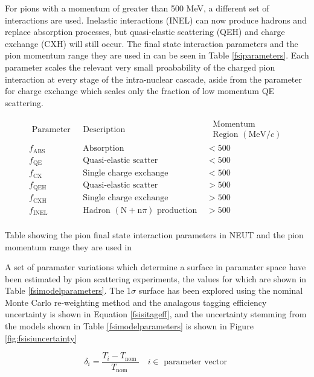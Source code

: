 For pions with a momentum of greater than 500 MeV, a different set of interactions are used. Inelastic interactions (INEL) can now produce hadrons and replace absorption processes, but quasi-elastic scattering (QEH) and charge exchange (CXH) will still occur. The final state interaction parameters and the pion momentum range they are used in can be seen in Table \ref{fsiparameters}. Each parameter scales the relevant very small proabability of the charged pion interaction at every stage of the intra-nuclear cascade, aside from the parameter for charge exchange which scales only the fraction of low momentum QE scattering. 


\begin{table}
$$
\begin{array}{ccc}
\text { Parameter } & \text { Description } & \begin{array}{c}
\text { Momentum } \\
\text { Region }(\mathrm{MeV} / c)
\end{array} \\
f_{\mathrm{ABS}} & \text { Absorption } & <500 \\
f_{\mathrm{QE}} & \text { Quasi-elastic scatter } & <500 \\
f_{\mathrm{CX}} & \text { Single charge exchange } & <500 \\
f_{\mathrm{QEH}} & \text { Quasi-elastic scatter } & >500 \\
f_{\mathrm{CXH}} & \text { Single charge exchange } & >500 \\
f_{\mathrm{INEL}} & \text { Hadron }(\mathrm{N}+\mathrm{n} \pi) \text { production } & >500 \\
\end{array}
$$
\caption{Table showing the pion final state interaction parameters in NEUT and the pion momentum range they are used in}
\label{fsiparameters}
\end{table}
A set of paramater variations which determine a surface in paramater space have been estimated by pion scattering experiments, the values for which are shown in Table \ref{fsimodelparameters}. The 1$\sigma$ surface has been explored using the nominal Monte Carlo re-weighting method and the analagous tagging efficiency uncertainty is shown in Equation \ref{fsisitageff}, and the uncertainty stemming from the models shown in Table \ref{fsimodelparameters} is shown in Figure \ref{fig:fsisiuncertainty}

\begin{equation}
\delta_{i}=\frac{T_{i}-T_{\text {nom }}}{T_{\text {nom }}} \quad i \in \text { parameter vector }
\label{fsisitageff}
\end{equation}


